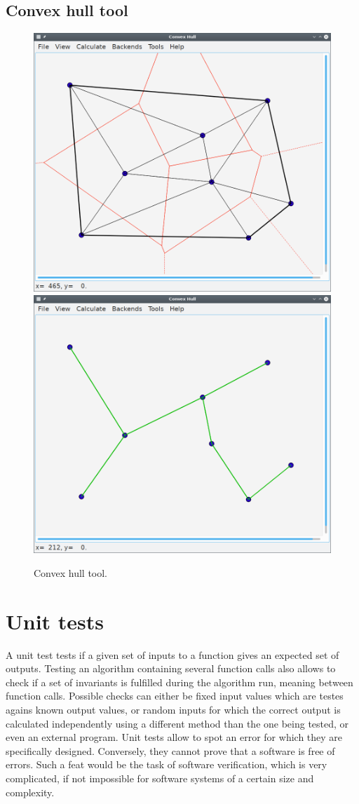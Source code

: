 \subsection{Convex hull tool}
\begin{figure}[htb]
	\centering
	\includegraphics[width = 0.49 \textwidth]{figures/hullgui_voro}
	\hspace{0.05cm}
	\includegraphics[width = 0.49 \textwidth]{figures/hullgui_kruskal}
	\caption[Convex hull tool.]{Convex hull tool.
		\label{fig:linesgui}}
\end{figure}




\section{Unit tests}
\label{sec:unit_tests}
A unit test tests if a given set of inputs to a function gives an expected set of outputs.
Testing an algorithm containing several function calls also allows to check if a set of invariants
is fulfilled during the algorithm run, meaning between function calls.
Possible checks can either be fixed input values which are testes agains known output values,
or random inputs for which the correct output is calculated independently using a different 
method than the one being tested, or even an external program.
Unit tests allow to spot an error for which they are specifically designed. Conversely, they cannot 
prove that a software is free of errors. Such a feat would be the task of software verification, 
which is very complicated, if not impossible for software systems of a certain size and complexity.

